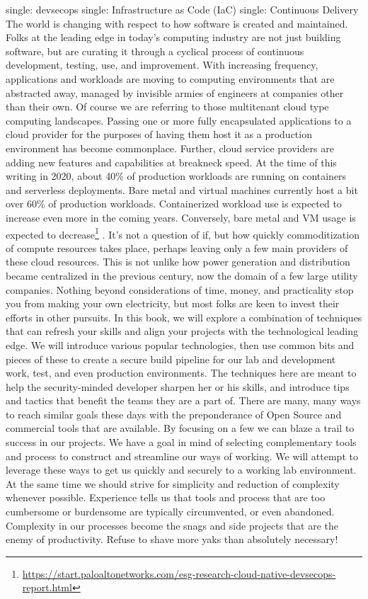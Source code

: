 single: devsecops single: Infrastructure as Code (IaC) single:
Continuous Delivery
\justify
The world is changing with respect to how software is created and
maintained. Folks at the leading edge in today's computing industry are
not just building software, but are curating it through a cyclical
process of continuous development, testing, use, and improvement. With
increasing frequency, applications and workloads are moving to computing
environments that are abstracted away, managed by invisible armies of
engineers at companies other than their own. Of course we are referring
to those multitenant cloud type computing landscapes. Passing one or
more fully encapsulated applications to a cloud provider for the
purposes of having them host it as a production environment has become
commonplace. Further, cloud service providers are adding new features
and capabilities at breakneck speed.
\justify
At the time of this writing in 2020, about 40\% of production workloads
are running on containers and serverless deployments. Bare metal and
virtual machines currently host a bit over 60\% of production workloads.
Containerized workload use is expected to increase even more in the
coming years. Conversely, bare metal and VM usage is expected to
decrease\footnote{\url{https://start.paloaltonetworks.com/esg-research-cloud-native-devsecops-report.html}}
. It's not a question of if, but how quickly commoditization of compute
resources takes place, perhaps leaving only a few main providers of
these cloud resources. This is not unlike how power generation and
distribution became centralized in the previous century, now the domain
of a few large utility companies. Nothing beyond considerations of time,
money, and practicality stop you from making your own electricity, but
most folks are keen to invest their efforts in other pursuits.
\justify
In this book, we will explore a combination of techniques that can
refresh your skills and align your projects with the technological
leading edge. We will introduce various popular technologies, then use
common bits and pieces of these to create a secure build pipeline for
our lab and development work, test, and even production environments.
The techniques here are meant to help the security-minded developer
sharpen her or his skills, and introduce tips and tactics that benefit
the teams they are a part of. There are many, many ways to reach similar
goals these days with the preponderance of Open Source and commercial
tools that are available. By focusing on a few we can blaze a trail to
success in our projects.
\justify
We have a goal in mind of selecting complementary tools and process to
construct and streamline our ways of working. We will attempt to
leverage these ways to get us quickly and securely to a working lab
environment. At the same time we should strive for simplicity and
reduction of complexity whenever possible. Experience tells us that
tools and process that are too cumbersome or burdensome are typically
circumvented, or even abandoned. Complexity in our processes become the
snags and side projects that are the enemy of productivity. Refuse to
shave more yaks than absolutely necessary!
